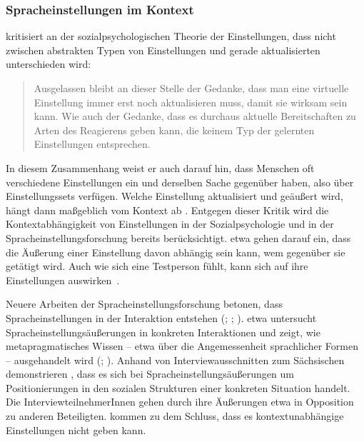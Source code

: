 \subsubsection{Spracheinstellungen im Kontext}
\label{sec:Interaktion}
\citet[72--73]{Hermanns.2002} kritisiert an der sozialpsychologischen Theorie der Einstellungen, dass nicht zwischen abstrakten Typen von Einstellungen und gerade aktualisierten unterschieden wird:
\begin{quote}Ausgelassen bleibt an dieser Stelle der Gedanke, dass man eine virtuelle Einstellung immer erst noch aktualisieren muss, damit sie wirksam sein kann. Wie auch der Gedanke, dass es durchaus aktuelle Bereitschaften zu Arten des Reagierens geben kann, die keinem Typ der gelernten Einstellungen entsprechen.~\citep[73]{Hermanns.2002}\end{quote}
In diesem Zusammenhang weist er auch darauf hin, dass Menschen oft verschiedene Einstellungen ein und derselben Sache gegen{\"u}ber haben, also {\"u}ber Einstellungssets verf{\"u}gen. 
Welche Einstellung aktualisiert %
und geäußert %
wird, h{\"a}ngt dann ma{\ss}geblich vom Kontext ab \citep[73--74]{Hermanns.2002}. 
Entgegen dieser Kritik wird die Kontextabhängigkeit von Einstellungen in der Sozialpsychologie und in der Spracheinstellungsforschung bereits berücksichtigt. 
\citet[210--211]{Jonas.2014} etwa gehen darauf ein, dass die Äußerung einer Einstellung davon abhängig sein kann, wem gegenüber sie getätigt wird. 
Auch wie sich eine Testperson f{\"u}hlt, kann sich auf ihre Einstellungen auswirken~\citep[s.][218]{Cargile.1994}. 

Neuere Arbeiten der Spracheinstellungsforschung betonen, dass Spracheinstellungen in der Interaktion entstehen (\citealp[s.][205--206]{Tophinke.2006}; \citealp[200]{Liebscher.2009}; \citealp[5--6]{Konig.2014}). \citet{Konig.2014} etwa untersucht Spracheinstellungsäußerungen in konkreten Interaktionen und zeigt, wie metapragmatisches Wissen -- etwa über die Angemessenheit sprachlicher Formen -- ausgehandelt wird (\citealp[s. auch][200]{Konig2015}; \citealp{Konig.2017}). 
Anhand von Interviewausschnitten zum Sächsischen demonstrieren \citet[206--207]{Liebscher.2009}, dass es sich bei %
Spracheinstellungsäußerungen %
um Positionierungen in den sozialen Strukturen einer konkreten Situation handelt. 
Die InterviewteilnehmerInnen gehen durch ihre Äußerungen etwa in Opposition zu anderen Beteiligten. 
\citet[218]{Liebscher.2009} kommen zu dem Schluss, dass es kontextunabhängige Einstellungen nicht geben kann. 

